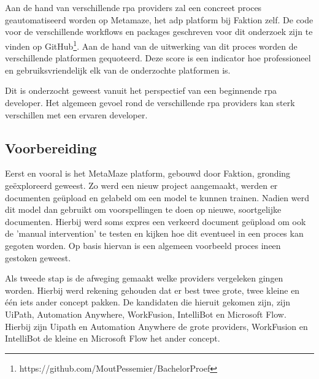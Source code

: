 
\chapter{}
\label{ch:methodologie}


Aan de hand van verschillende \acrshort{rpa} providers zal een concreet proces geautomatiseerd worden op Metamaze, het \acrfull{adp} platform bij Faktion zelf. De code voor de verschillende workflows en packages geschreven voor dit onderzoek zijn te vinden op GitHub\footnote{https://github.com/MoutPessemier/BachelorProef}. Aan de hand van de uitwerking van dit proces worden de verschillende platformen gequoteerd. Deze score is een indicator hoe professioneel en gebruiksvriendelijk elk van de onderzochte platformen is.

Dit is onderzocht geweest vanuit het perspectief van een beginnende \acrshort{rpa} developer. Het algemeen gevoel rond de verschillende \acrshort{rpa} providers kan sterk verschillen met een ervaren developer.


\section{Voorbereiding}
Eerst en vooral is het MetaMaze platform, gebouwd door Faktion, gronding geëxploreerd geweest. Zo werd een nieuw project aangemaakt, werden er documenten geüpload en gelabeld om een model te kunnen trainen. Nadien werd dit model dan gebruikt om voorspellingen te doen op nieuwe, soortgelijke documenten. Hierbij werd soms expres een verkeerd document geüpload om ook de 'manual intervention' te testen en kijken hoe dit eventueel in een proces kan gegoten worden. Op basis hiervan is een algemeen voorbeeld proces ineen gestoken geweest.

Als tweede stap is de afweging gemaakt welke providers vergeleken gingen worden. Hierbij werd rekening gehouden dat er best twee grote, twee kleine en één iets ander concept pakken. De kandidaten die hieruit gekomen zijn, zijn UiPath, Automation Anywhere, WorkFusion, IntelliBot en Microsoft Flow. Hierbij zijn Uipath en Automation Anywhere de grote providers, WorkFusion en IntelliBot de kleine en Microsoft Flow het ander concept.

